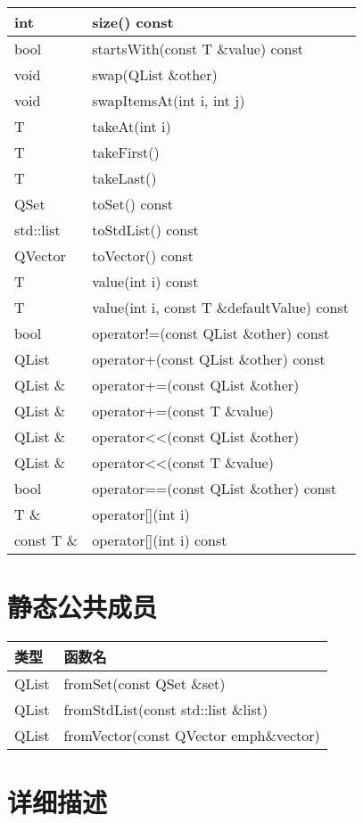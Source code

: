 \begin{longtable}{|l|m{25em}|}
\hline
int& 	size() const\\
\hline
bool& 	startsWith(const T \&value) const\\
\hline
void& 	swap(QList \&other)\\
\hline
void& 	swapItemsAt(int i, int j)\\
\hline
T& 	takeAt(int i)\\
\hline
T& 	takeFirst()\\
\hline
T& 	takeLast()\\
\hline
QSet 	&toSet() const\\
\hline
std::list& 	toStdList() const\\
\hline
QVector &	toVector() const\\
\hline
T 	&value(int i) const\\
\hline
T 	&value(int i, const T \&defaultValue) const\\
\hline
bool &	operator!=(const QList \&other) const\\
\hline
QList& 	operator+(const QList \&other) const\\
\hline
QList \& &	operator+=(const QList \&other)\\
\hline
QList \& &	operator+=(const T \&value)\\
\hline
QList \& &	operator<<(const QList \&other)\\
\hline
QList \& &	operator<<(const T \&value)\\
\hline
bool 	&operator==(const QList \&other) const\\
\hline
T \& 	& operator[](int i)\\
\hline
const T \& & 	operator[](int i) const\\
\hline
\end{longtable}


\section{静态公共成员}

\begin{tabular}{|l|l|}
\hline
 类型& 	函数名\\
\hline
QList& 	fromSet(const QSet \&set)\\
\hline
QList& 	fromStdList(const std::list \&list)\\
\hline
QList& 	fromVector(const QVector emph{\&vector})\\
\hline
\end{tabular}

\section{详细描述}

